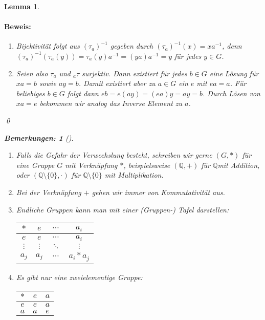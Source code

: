 \documentclass{report}
\newcommand{\Q}{\mathbb{Q}}
\newcommand{\mQ}{\(\mathbb{Q}\)}
\theoremstyle{customrem}
\newtheorem*{bemerkung2}{Bemerkungen\textnormal:}
\newenvironment{bemerkungen}[1][]{\begin{bemerkung2}[#1]\leavevmode}{\end{bemerkung2}}
\theoremstyle{customdef}
\newtheorem{lemma}[definition]{Lemma}
\renewenvironment{proof}{\paragraph{Beweis: }}{\qed}
\theoremstyle{customenv}
\begin{document}
\begin{lemma}
		\begin{proof}
			\begin{enumerate}
				\item Bijektivität folgt aus  \((\tau_a)^{-1}\) gegeben durch \((\tau_a)^{-1}(x) = x a^{-1}\), denn \((\tau_a)^{-1}(\tau_a(y)) = \tau_a(y)a^{-1} = (y a) a^{-1} = y\) für jedes \(y \in G\).
				\item Seien also \(\tau_a\) und \(_{a}\tau\) surjektiv. Dann existiert für jedes \(b \in G\) eine Lösung für 
				\(x a = b\) sowie \(a y = b\). 
				Damit existiert aber zu \(a \in G\) ein  \(e\) mit \(ea = a\). Für beliebiges \(b \in G\) folgt dann \(e b = e (a y) = (e a) y = ay = b\).	Durch Lösen von \(x a = e\) bekommen wir analog das Inverse Element zu \(a\).
			\end{enumerate}
		\end{proof}
		\vspace{.25cm}
		\begin{bemerkungen}
			\begin{enumerate}
				\item Falls die Gefahr der Verwechslung besteht, schreiben wir gerne \((G, \ast)\) für eine Gruppe \(G\) mit Verknüpfung \(\ast\), 
				beispielsweise \((\Q, +)\) für \mQ mit Addition, oder \((\Q \setminus \{0\}, \cdot)\) für \(\Q \setminus \{0\}\) mit Multiplikation.
				\item Bei der Verknüpfung \(+\) gehen wir immer von Kommutativität aus.
				\item Endliche Gruppen kann man mit einer (Gruppen-) Tafel darstellen:
				\begin{center}
					\begin{tabular}{c || c  c  c}
						\(\ast\)   & \(e\)      & \(\cdots\) & \(a_i\)	    \\\hline\hline
						\(e\)      & \(e\)      & \(\cdots\)	& \(a_i\)     \\
						\(\vdots\) & \(\vdots\) & \(\ddots\)	& \(\vdots\)  \\
						\(a_j\) 	 &\(a_j\)     & \(\cdots\)	& \(a_i * a_j\)
					\end{tabular}
				\end{center}\pagebreak[2]
					
				\item Es gibt nur eine zweielementige Gruppe:
				\begin{center}
					\begin{tabular}{c || c | c}
						\(\ast\) & \(e\) & \(a\)\\\hline\hline
						\(e\)    & \(e\) & \(a\)\\\hline
						\(a\)    & \(a\) & \(e\)
					\end{tabular}
				\end{center}
			\end{enumerate}
		\end{bemerkungen}
	\end{lemma}
	
\end{document}
